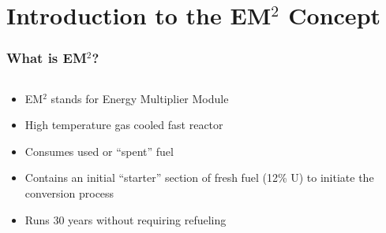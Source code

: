 
\section{Introduction to the EM$^{2}$ Concept}


\begin{frame}
\frametitle{What is EM$^{2}$?}
\begin{columns}[t]
\begin{column}{.6\textwidth}
\begin{itemize}
\item EM$^{2}$ stands for Energy Multiplier Module
\item High temperature gas cooled fast reactor
\item Consumes used or ``spent'' fuel 
\item Contains an initial ``starter'' section of fresh fuel (12\%  U) to initiate the conversion process
\item Runs 30 years without requiring refueling
\end{itemize}
\end{column}
\begin{column}{.4\textwidth}
\end{column}
\end{columns}
\end{frame}


